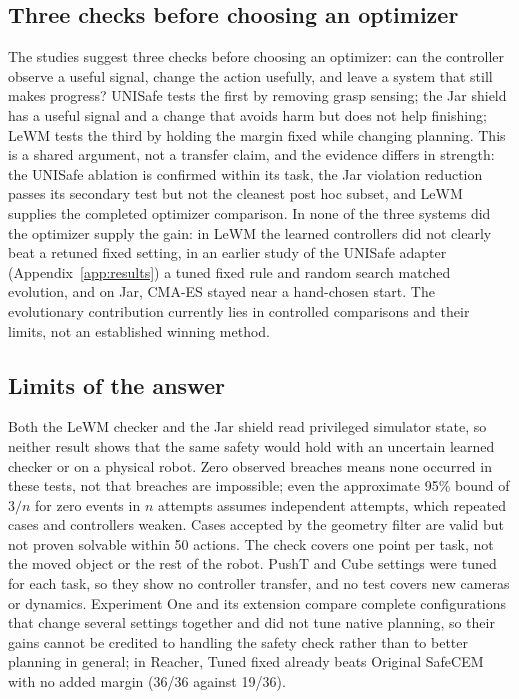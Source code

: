 \documentclass[sigconf,nonacm]{acmart}
\begin{document}
\subsection{Three checks before choosing an optimizer}
The studies suggest three checks before choosing an optimizer: can the
controller observe a useful signal, change the action usefully, and leave a
system that still makes progress? UNISafe tests the first by removing grasp
sensing; the Jar shield has a useful signal and a change that avoids harm
but does not help finishing; LeWM tests the third by holding the margin
fixed while changing planning. This is a shared argument, not a transfer
claim, and the evidence differs in strength: the UNISafe ablation is
confirmed within its task, the Jar violation reduction passes its secondary
test but not the cleanest post hoc subset, and LeWM supplies the completed
optimizer comparison. In none of the three systems did the optimizer supply the gain:
in LeWM the learned controllers did not clearly beat a retuned fixed
setting, in an earlier study of the UNISafe adapter (Appendix~\ref{app:results}) a
tuned fixed rule and random search matched evolution, and on Jar, CMA-ES stayed near a hand-chosen start. The
evolutionary contribution currently lies in controlled comparisons and their
limits, not an established winning method.

\subsection{Limits of the answer}\label{sec:limits}
Both the LeWM checker and the Jar shield read privileged simulator state, so
neither result shows that the same safety would hold with an uncertain
learned checker or on a physical robot. Zero observed breaches means none
occurred in these tests, not that breaches are impossible; even the
approximate 95\% bound of $3/n$ for zero events in $n$ attempts assumes
independent attempts, which repeated cases and controllers weaken. Cases
accepted by the geometry filter are valid but not proven solvable within 50
actions. The check covers one point per task, not the moved object or the
rest of the robot. PushT and Cube settings were tuned for each task, so they
show no controller transfer, and no test covers new cameras or dynamics.
Experiment One and its extension compare complete configurations that
change several settings together and did not tune native planning, so their
gains cannot be credited to handling the safety check rather than to better
planning in general; in Reacher, Tuned fixed already beats Original SafeCEM
with no added margin (36/36 against 19/36).
\end{document}
